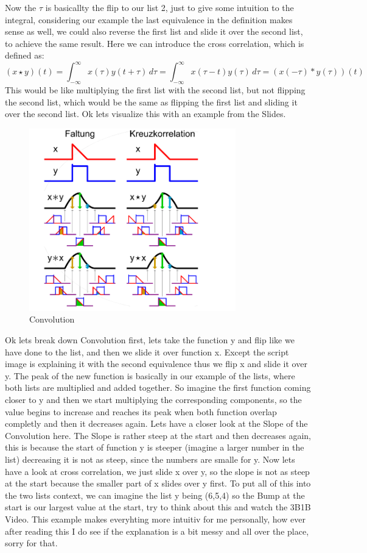 \documentclass[a4paper]{article}
\begin{document}
Now the $\tau $ is basicallty the flip to our list 2, just to give some intuition to the integral, considering our example the last equivalence in the definition makes sense as well, we could also reverse the first list and slide it over the second list, to achieve the same result. Here we can introduce the cross correlation, 
which is defined as: 
\[
(x \star y)(t) = \int_{-\infty}^{\infty} x(\tau) y(t + \tau) \, d\tau = \int_{-\infty}^{\infty} x(\tau  -t) y(\tau) \, d\tau = (x(- \tau ) * y(\tau))(t)
\]
This would be like multiplying the first list with the second list, but not flipping the second list, which would be the same as flipping the first list and sliding it over the second list. 
Ok lets visualize this with an example from the Slides. 
\begin{figure}[h]
    \centering
    \includegraphics[width=0.8\textwidth]{images/convolution.png}
    \caption{Convolution}
    \label{fig:Convolution and Cross Correlation}
\end{figure}
Ok lets break down Convolution first, lets take the function y and flip like we have done to the list, and then we slide it over function x. Except the script image is explaining it with the second equivalence thus we flip x and slide it over y. The peak of the new function is basically in our example of the lists, where both lists are multiplied and added together. So imagine the first function coming closer to y and then we start multiplying
the corresponding components, so the value begins to increase and reaches its peak when both function overlap completly and then it decreases again. Lets have a closer look at the Slope of the Convolution here. The Slope is rather steep at the start and then decreases again, this is because the start of function y is steeper (imagine a larger number in the list)
decreasing it is not as steep, since the numbers are smalle for y. Now lets have a look at cross correlation, we just slide x over y, so the slope is not as steep at the start because the smaller part of x slides over y first. To put all of this into the two lists context, we can imagine the list y being (6,5,4) so the Bump at the start is our largest value at the start, try to think about this and watch the 3B1B Video. 
This example makes everyhting more intuitiv for me personally, how ever after reading this I do see if the explanation is a bit messy and all over the place, sorry for that.
\end{document}

